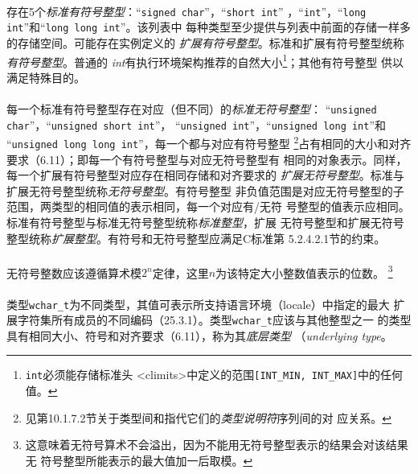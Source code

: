\paragraph{}
存在5个\textit{标准有符号整型}：``\texttt{signed char}''，``\texttt{short int}''
，``\texttt{int}''，``\texttt{long int}''和``\texttt{long long int}''。该列表中
每种类型至少提供与列表中前面的存储一样多的存储空间。可能存在实例定义的
\textit{扩展有符号整型}。标准和扩展有符号整型统称\textit{有符号整型}。普通的
\textit{int}有执行环境架构推荐的自然大小\footnote{\texttt{int}必须能存储标准头
<climits>中定义的范围\texttt{[INT\_MIN, INT\_MAX]}中的任何值。}；其他有符号整型
供以满足特殊目的。

\paragraph{}
每一个标准有符号整型存在对应（但不同）的\textit{标准无符号整型}：
``\texttt{unsigned char}''，``\texttt{unsigned short int}''，
``\texttt{unsigned int}''，``\texttt{unsigned long int}''和
``\texttt{unsigned long long int}''，每一个都与对应有符号整型
\footnote{见第10.1.7.2节关于类型间和指代它们的\textit{类型说明符}序列间的对
应关系。}占有相同的大小和对齐要求（6.11）；即每一个有符号整型与对应无符号整型有
相同的对象表示。同样，每一个扩展有符号整型对应存在相同存储和对齐要求的
\textit{扩展无符号整型}。标准与扩展无符号整型统称\textit{无符号整型}。有符号整型
非负值范围是对应无符号整型的子范围，两类型的相同值的表示相同，每一个对应有/无符
号整型的值表示应相同。标准有符号整型与标准无符号整型统称\textit{标准整型}，扩展
无符号整型和扩展无符号整型统称\textit{扩展整型}。有符号和无符号整型应满足C标准第
5.2.4.2.1节的约束。

\paragraph{}
无符号整数应该遵循算术模$2^n$定律，这里$n$为该特定大小整数值表示的位数。
\footnote{这意味着无符号算术不会溢出，因为不能用无符号整型表示的结果会对该结果无
符号整型所能表示的最大值加一后取模。}

\paragraph{}
类型\texttt{wchar\_t}为不同类型，其值可表示所支持语言环境（locale）中指定的最大
扩展字符集所有成员的不同编码（25.3.1）。类型\texttt{wchar\_t}应该与其他整型之一
的类型具有相同大小、符号和对齐要求（6.11），称为其\textit{底层类型}
（\textit{underlying type}。

